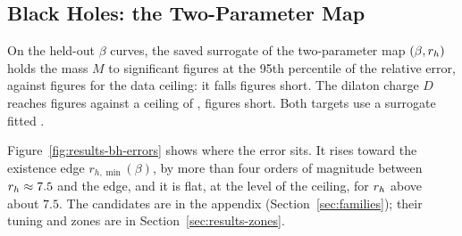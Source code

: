 \subsection{Black Holes: the Two-Parameter Map}
\label{sec:results-bh}

On the held-out $\beta$ curves, the saved surrogate of the two-parameter map $(\beta, r_h)$ holds the mass $M$ to \resultsBhMassTest{} significant figures at the 95th percentile of the relative error, against \resultsBhMassCeiling{} figures for the data ceiling: it falls \resultsBhMassGap{} figures short.
The dilaton charge $D$ reaches \resultsBhChargeTest{} figures against a ceiling of \resultsBhChargeCeiling{}, \resultsBhChargeGap{} figures short.
Both targets use a \resultsBhMassFamily{} surrogate fitted \resultsBhMassUnit{}.

Figure~\ref{fig:results-bh-errors} shows where the error sits.
It rises toward the existence edge $r_{h,\min}(\beta)$, by more than four orders of magnitude between $r_h \approx 7.5$ and the edge, and it is flat, at the level of the ceiling, for $r_h$ above about $7.5$.
The candidates are in the appendix (Section~\ref{sec:families}); their tuning and zones are in Section~\ref{sec:results-zones}.

